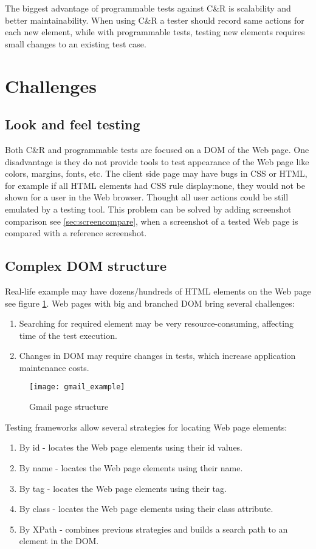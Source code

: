 The biggest advantage of programmable tests against C\&R is scalability and
better maintainability. When using C\&R a tester should record same actions for
each new element, while with  programmable tests, testing new elements requires
small changes to an existing test case. 

\section {Challenges}
	\label {sec:challenges}
	\subsection{Look and feel testing}
	    Both C\&R and programmable tests are focused on a DOM of the Web page.
	    One disadvantage is they do not provide tools to test appearance of the Web
	    page like colors, margins, fonts, etc. The client side page may have bugs in CSS
	    or HTML, for example if all HTML elements had CSS rule display:none, they
	    would not be shown for a user in the Web browser. Thought all user actions
	    could be still emulated by a testing tool. This problem can be solved by adding screenshot
      comparison see \ref{sec:screencompare}, when a screenshot of a tested Web
      page is compared with a reference screenshot. 
	\subsection{Complex DOM structure}
    Real-life example may have dozens/hundreds of HTML
		elements on the Web page see figure
		\ref{fig:gmailexample}.
		Web pages with big and branched DOM bring several challenges:
		\begin{enumerate}
		  \item Searching for required element may be very resource-consuming,
		  affecting time of the test execution. 
		  \item Changes in DOM may require changes in tests, which increase
		  application maintenance costs.
		\end{enumerate}
		
		\begin{figure}
		\centering
		  \texttt{[image: gmail\_example]}
		  \caption{Gmail page structure}
		  \label{fig:gmailexample}
		\end{figure}
		
		Testing frameworks allow several strategies for locating Web page elements:
		\begin{enumerate}
		  \item By id - locates the Web page elements using their id values.
		  \item By name - locates the Web page elements using their name.
		  \item By tag - locates the Web page elements using their tag.
		  \item By class - locates the Web page elements using their class attribute.
		  \item By XPath - combines previous strategies and builds a search
		  path to an element in the DOM.
		\end{enumerate}
		
